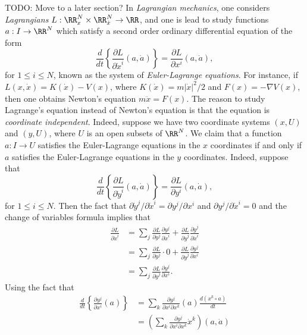 \begin{example}
    TODO: Move to a later section? In \emph{Lagrangian mechanics}, one considers \emph{Lagrangians} $L: \RR^N_x \times \RR^N_{\dot{x}} \to \RR$, and one is lead to study functions $a: I \to \RR^N$ which satisfy a second order ordinary differential equation of the form
    \[ \frac{d}{dt} \left\{ \frac{\partial L}{\partial \dot{x}^i} (a, \dot{a})  \right\} = \frac{\partial L}{\partial x^i}(a, \dot{a}), \]
    for $1 \leq i \leq N$, known as the system of \emph{Euler-Lagrange equations}. For instance, if $L(x,\dot{x}) = K(\dot{x}) - V(x)$, where $K(\dot{x}) = m |\dot{x}|^2 / 2$ and $F(x) = - \nabla V(x)$, then one obtains Newton's equation $m \ddot{x} = F(x)$. The reason to study Lagrange's equation instead of Newton's equation is that the equation is \emph{coordinate independent}. Indeed, suppose we have two coordinate systems $(x,U)$ and $(y,U)$, where $U$ is an open subsets of $\RR^N$. We claim that a function $a: I \to U$ satisfies the Euler-Lagrange equations in the $x$ coordinates if and only if $a$ satisfies the Euler-Lagrange equations in the $y$ coordinates. Indeed, suppose that
    \[ \frac{d}{dt} \left\{ \frac{\partial L}{\partial \dot{y}^i} (a, \dot{a})  \right\} = \frac{\partial L}{\partial y^i}(a, \dot{a}), \]
    for $1 \leq i \leq N$. Then the fact that $\partial \dot{y}^j / \partial \dot{x}^i = \partial y^j / \partial x^i$ and $\partial y^j / \partial \dot{x}^i = 0$ and the change of variables formula implies that
    \begin{align*}
        \frac{\partial L}{\partial \dot{x}^i} &= \sum_j \frac{\partial L}{\partial y^j} \frac{\partial y^j}{\partial \dot{x}^i} + \frac{\partial L}{\partial \dot{y}^j} \frac{\partial \dot{y}^j}{\partial \dot{x}^i}\\
        &= \sum_j \frac{\partial L}{\partial y^j} \cdot 0 + \frac{\partial L}{\partial \dot{y}^j} \frac{\partial y^j}{\partial x^i}\\
        &= \sum_j \frac{\partial L}{\partial \dot{y}^j} \frac{\partial y^j}{\partial x^i}.
    \end{align*}
    Using the fact that
    \begin{align*}
        \frac{d}{dt} \left\{ \frac{\partial y^j}{\partial x^i} (a) \right\} &= \sum_k \frac{\partial y^j}{\partial x^i \partial x^k}(a) \frac{d(x^k \circ a)}{dt}\\
        &= \left( \sum_k \frac{\partial y^j}{\partial x^i \partial x^k} \dot{x}^k \right)(a, \dot{a}) \\

\end{align*}
\end{example}
